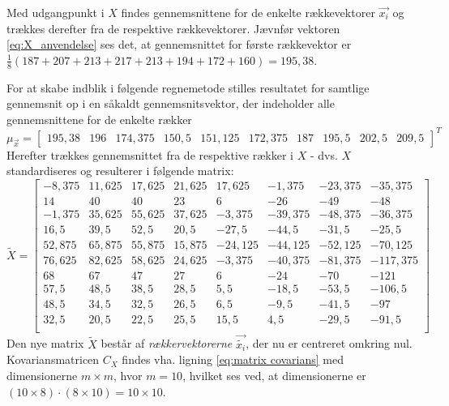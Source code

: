 Med udgangpunkt i $X$ findes gennemsnittene for de enkelte rækkevektorer $\vec{x_i}$ og trækkes derefter fra de respektive rækkevektorer. Jævnfør vektoren \vref{eq:X_anvendelse} ses det, at gennemsnittet for første rækkevektor er $\frac{1}{8} (187 + 207 + 213 + 217 + 213 + 194 + 172 + 160) = 195,38$.

For at skabe indblik i følgende regnemetode stilles resultatet for samtlige gennemsnit op i en såkaldt gennemsnitsvektor, der indeholder alle gennemsnittene for de enkelte rækker
\begin{equation}
\mu_{\vec{x}} = \begin{bmatrix}
195,38 & 196 & 174,375 & 150,5 & 151,125 & 172,375 & 187 & 195,5 & 202,5 & 209,5 
\end{bmatrix}^T
\label{eq:X_anvendelse}
\end{equation}
Herefter trækkes gennemsnittet fra de respektive rækker i $X$ - dvs. $X$ standardiseres og resulterer i følgende matrix:
\begin{equation}
\tilde{X}=\begin{bmatrix}
-8,375 & 11,625 & 17,625 & 21,625 & 17,625 & -1,375 & -23,375 & -35,375 \\
14 & 40 & 40 & 23 & 6 & -26 & -49 & -48 \\
-1,375 & 35,625 & 55,625 & 37,625 & -3,375 & -39,375 & -48,375 & -36,375 \\
16,5 & 39,5 & 52,5 & 20,5 & -27,5 & -44,5 & -31,5 & -25,5 \\
52,875 & 65,875 & 55,875 & 15,875 & -24,125 & -44,125 & -52,125 & -70,125 \\
76,625 & 82,625 & 58,625 & 24,625 & -3,375 & -40,375 & -81,375 & -117,375 \\
68 & 67 & 47 & 27 & 6 & -24 & -70 & -121 \\
57,5 & 48,5 & 38,5 & 28,5 & 5,5 & -18,5 & -53,5 & -106,5 \\
48,5 & 34,5 & 32,5 & 26,5 & 6,5 & -9,5 & -41,5 & -97 \\
32,5 & 20,5 & 22,5 & 25,5 & 15,5 & 4,5 & -29,5 & -91,5 \\
\end{bmatrix}
\label{eq:X_tilde}
\end{equation}
Den nye matrix $\tilde{X}$ består af \emph{rækkervektorerne} $\vec{\tilde{x_i}}$, der nu er centreret omkring nul. Kovariansmatricen $C_{X}$ findes vha. ligning \ref{eq:matrix covarians} med dimensionerne $m \times m$, hvor $m = 10$, hvilket ses ved, at dimensionerne er $(10 \times 8) \cdot (8 \times 10) = 10 \times 10$.
